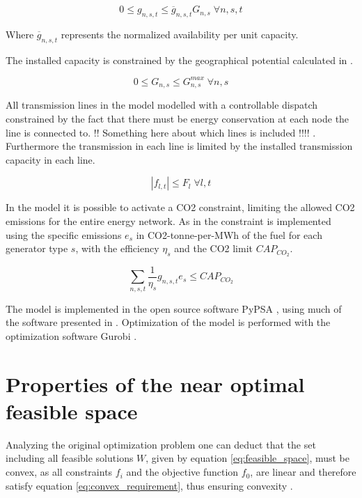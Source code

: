 \begin{equation}
0 \leq g_{n,s,t} \leq \overline{g}_{n,s,t} G_{n,s} \; \forall n,s,t
\end{equation}

Where $\overline{g}_{n,s,t}$ represents the normalized availability per unit capacity. 

The installed capacity is constrained by the geographical potential calculated in \cite{PyPSA_euro_30_model}.

\begin{equation}
0 \leq G_{n,s} \leq G_{n,s}^{max} \; \forall n,s
\end{equation}

All transmission lines in the model modelled with a controllable dispatch constrained by the fact that there must be energy conservation at each node the line is connected to. !! Something here about which lines is included !!!! . Furthermore the transmission in each line is limited by the installed transmission capacity in each line. 

\begin{equation}
|f_{l,t}| \leq F_l \; \forall l,t
\end{equation}

In the model it is possible to activate a CO2 constraint, limiting the allowed CO2 emissions for the entire energy network. As in \cite{PyPSA_euro_30_model} the constraint is implemented using the specific emissions $e_s$ in CO2-tonne-per-MWh of the fuel for each generator type $s$, with the efficiency $\eta_s$ and the CO2 limit $CAP_{CO_2}$. 

\begin{equation}
\sum_{n,s,t} \frac{1}{\eta_s}g_{n,s,t} e_s \leq CAP_{CO_2}
\end{equation}

The model is implemented in the open source software PyPSA \cite{Pypsa}, using much of the software presented in \cite{PyPSA_euro_30_model}. Optimization of the model is performed with the optimization software Gurobi \cite{Gurobi}. 

\section{Properties of the near optimal feasible space}\label{sec:properties_of_hull}

Analyzing the original optimization problem one can deduct that the set including all feasible solutions $W$, given by equation \ref{eq:feasible_space}, must be convex, as all constraints $f_i$ and the objective function $f_0$, are linear and therefore satisfy equation \vref{eq:convex_requirement}, thus ensuring convexity \cite{ConvexOpimization}. 

